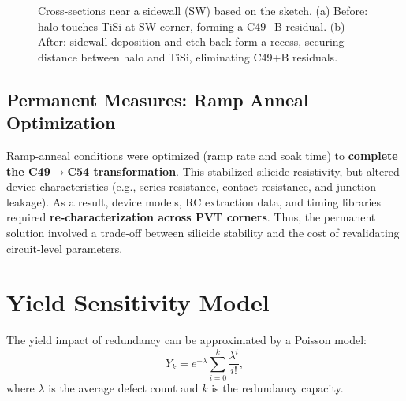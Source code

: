 \documentclass[conference]{IEEEtran}
\begin{document}
\begin{figure*}[!t]
{}
  \caption{Cross-sections near a sidewall (SW) based on the sketch.
  (a) Before: halo touches TiSi at SW corner, forming a C49+B residual. 
  (b) After: sidewall deposition and etch-back form a recess, securing distance between halo and TiSi, eliminating C49+B residuals.}
  \label{fig:fig2_sketch}
\end{figure*}

\subsection{Permanent Measures: Ramp Anneal Optimization}
Ramp-anneal conditions were optimized (ramp rate and soak time)
to \textbf{complete the C49$\rightarrow$C54 transformation}. This
stabilized silicide resistivity, but altered device characteristics
(e.g., series resistance, contact resistance, and junction leakage).
As a result, device models, RC extraction data, and timing libraries
required \textbf{re-characterization across PVT corners}. Thus, the
permanent solution involved a trade-off between silicide stability and
the cost of revalidating circuit-level parameters.

\section{Yield Sensitivity Model}
The yield impact of redundancy can be approximated by a Poisson model:
\[
Y_k = e^{-\lambda} \sum_{i=0}^{k} \frac{\lambda^i}{i!},
\]
where $\lambda$ is the average defect count and $k$ is the redundancy capacity.
\end{document}
